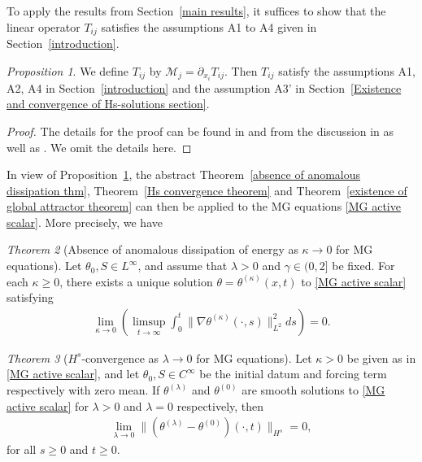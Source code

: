 \documentclass[reqno]{amsart}%
\theoremstyle{definition}
\theoremstyle{remark}
\numberwithin{equation}{section}
\newtheorem{theorem}{Theorem}
\newtheorem{proposition}[theorem]{Proposition}
\newcommand{\1}{\mathbf{1}}
\numberwithin{equation}{section}
\numberwithin{theorem}{section}
\numberwithin{figure}{section}
\begin{document}
To apply the results from Section~\ref{main results}, it suffices to show that the linear operator $T_{ij}$ satisfies the assumptions A1 to A4 given in Section~\ref{introduction}. 
\begin{proposition}\label{assumption checked}
We define $T_{ij}$ by $\mathcal{M}_j=\partial_{x_i}T_{ij}$. Then $T_{ij}$ satisfy the assumptions A1, A2, A4 in Section~\ref{introduction} and the assumption A3' in Section~\ref{Existence and convergence of Hs-solutions section}.
\end{proposition}
\begin{proof}
The details for the proof can be found in \cite[Lemma~5.1--5.2]{FS18} and from the discussion in \cite[Section 4]{FV11a} as well as \cite[Section 7]{FS21}. We omit the details here. 
\end{proof} 
In view of Proposition~\ref{assumption checked}, the abstract Theorem~\ref{absence of anomalous dissipation thm}, Theorem~\ref{Hs convergence theorem} and Theorem~\ref{existence of global attractor theorem} can then be applied to the MG equations \eqref{MG active scalar}. More precisely, we have

\begin{theorem}[Absence of anomalous dissipation of energy as $\kappa\to0$ for MG equations]\label{absence of anomalous dissipation MG}
Let $\theta_0,S\in L^\infty$, and assume that $\lambda>0$ and $\gamma\in(0,2]$ be fixed. For each $\kappa\ge0$, there exists a unique solution $\theta=\theta^{(\kappa)}(x,t)$ to \eqref{MG active scalar} satisfying
\begin{align*}
\lim_{\kappa\to0}\left(\limsup_{t\to\infty}\int_{0}^{t}\|\nabla\theta^{(\kappa)}(\cdot,s)\|_{L^2}^2ds\right)=0.
\end{align*}
\end{theorem}

\begin{theorem}[$H^s$-convergence as $\lambda\rightarrow0$ for MG equations]\label{Hs convergence MG}
Let $\kappa>0$ be given as in \eqref{MG active scalar}, and let $\theta_0,S\in C^\infty$ be the initial datum and forcing term respectively with zero mean. If $\theta^{(\lambda)}$ and $\theta^{(0)}$ are smooth solutions to \eqref{MG active scalar} for $\lambda>0$ and $\lambda=0$ respectively, then 
\begin{align*} 
\lim_{\lambda\rightarrow0}\|(\theta^{(\lambda)}-\theta^{(0)})(\cdot,t)\|_{H^s}=0,
\end{align*}
for all $s\ge0$ and $t\ge0$.
\end{theorem}
\end{document}
